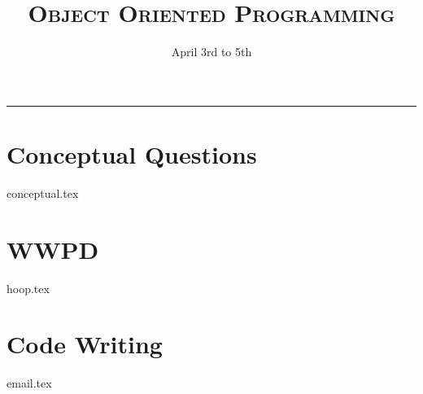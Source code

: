 \documentclass{exam}
\title{\textsc{Object Oriented Programming}}
\date{April 3rd to 5th}
\begin{document}
\maketitle
\rule{\textwidth}{0.15em}
\fontsize{12}{15}\selectfont


\begin{questions}
\section{Conceptual Questions}
{conceptual.tex}

\newpage
\section{WWPD}

{hoop.tex}
\newpage

\section{Code Writing}
{email.tex}

\end{questions}
\end{document}

